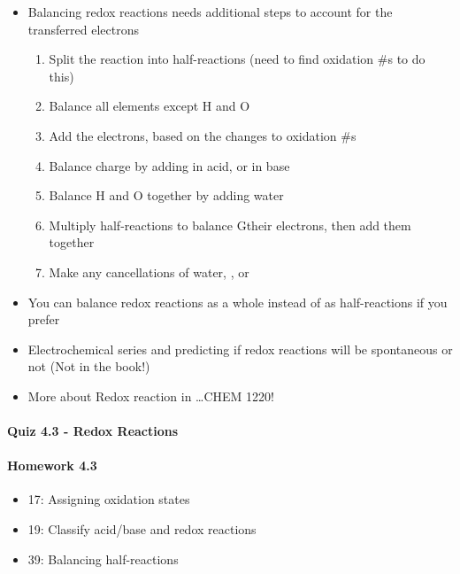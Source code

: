 \documentclass[12pt, openany, letterpaper]{memoir}
\begin{document}
\begin{itemize}
\begin{itemize}
\begin{itemize}
        \end{itemize}
      \item Balancing redox reactions needs additional steps to account for the transferred electrons
        \begin{enumerate}
          \item Split the reaction into half-reactions (need to find oxidation \#s to do this)
          \item Balance all elements except H and O
          \item Add the electrons, based on the changes to oxidation \#s
          \item Balance charge by adding  in acid, or  in base
          \item Balance H and O together by adding water
          \item Multiply half-reactions to balance Gtheir electrons, then add them together
          \item Make any cancellations of water, , or 
        \end{enumerate}
      \item You can balance redox reactions as a whole instead of as half-reactions if you prefer
      \item Electrochemical series and predicting if redox reactions will be spontaneous or not (Not in the book!)
      \item More about Redox reaction in \ldots CHEM 1220!
    \end{itemize}
\end{itemize}

\paragraph*{Quiz 4.3 - Redox Reactions}
\paragraph*{Homework 4.3}
\begin{itemize}
  \item 17: Assigning oxidation states
  \item 19: Classify acid/base and redox reactions
  \item 39: Balancing half-reactions
\end{itemize}
\end{document}
